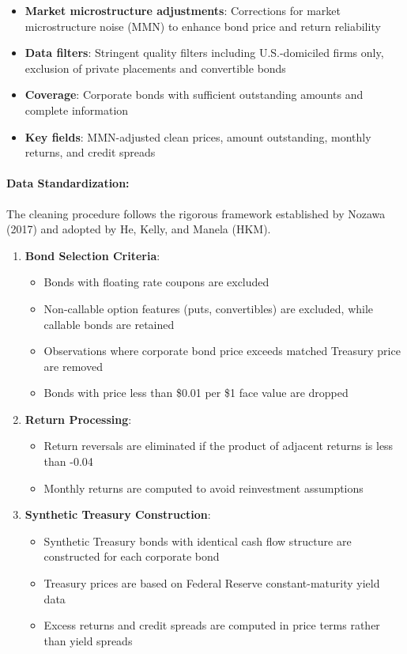 \documentclass{article}
\begin{document}
\begin{appendices}
\begin{itemize}
    \item \textbf{Market microstructure adjustments}: Corrections for market microstructure noise (MMN) to enhance bond price and return reliability
    \item \textbf{Data filters}: Stringent quality filters including U.S.-domiciled firms only, exclusion of private placements and convertible bonds
    \item \textbf{Coverage}: Corporate bonds with sufficient outstanding amounts and complete information
    \item \textbf{Key fields}: MMN-adjusted clean prices, amount outstanding, monthly returns, and credit spreads
\end{itemize}

\paragraph{Data Standardization:}

The cleaning procedure follows the rigorous framework established by Nozawa (2017) and adopted by He, Kelly, and Manela (HKM).

\begin{enumerate}
    \item \textbf{Bond Selection Criteria}:
    \begin{itemize}
        \item Bonds with floating rate coupons are excluded
        \item Non-callable option features (puts, convertibles) are excluded, while callable bonds are retained
        \item Observations where corporate bond price exceeds matched Treasury price are removed
        \item Bonds with price less than \$0.01 per \$1 face value are dropped
    \end{itemize}

    \item \textbf{Return Processing}:
    \begin{itemize}
        \item Return reversals are eliminated if the product of adjacent returns is less than -0.04
        \item Monthly returns are computed to avoid reinvestment assumptions
    \end{itemize}

    \item \textbf{Synthetic Treasury Construction}:
    \begin{itemize}
        \item Synthetic Treasury bonds with identical cash flow structure are constructed for each corporate bond
        \item Treasury prices are based on Federal Reserve constant-maturity yield data
        \item Excess returns and credit spreads are computed in price terms rather than yield spreads
    \end{itemize}


\end{enumerate}
\end{appendices}
\end{document}
